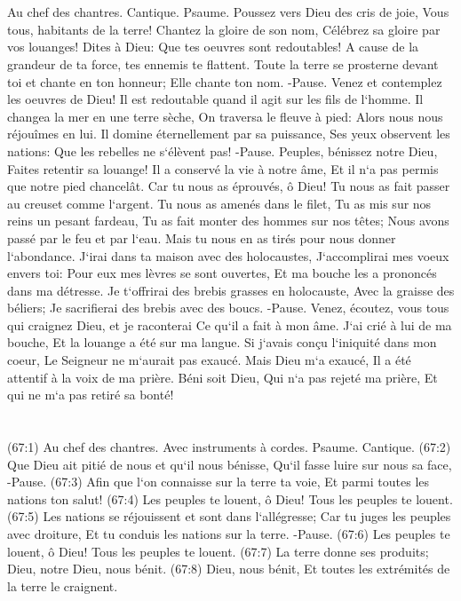 \chapter{}

\verse Au chef des chantres. Cantique. Psaume. Poussez vers Dieu des cris de joie, Vous tous, habitants de la terre! 
\verse Chantez la gloire de son nom, Célébrez sa gloire par vos louanges! 
\verse Dites à Dieu: Que tes oeuvres sont redoutables! A cause de la grandeur de ta force, tes ennemis te flattent. 
\verse Toute la terre se prosterne devant toi et chante en ton honneur; Elle chante ton nom. -Pause. 
\verse Venez et contemplez les oeuvres de Dieu! Il est redoutable quand il agit sur les fils de l`homme. 
\verse Il changea la mer en une terre sèche, On traversa le fleuve à pied: Alors nous nous réjouîmes en lui. 
\verse Il domine éternellement par sa puissance, Ses yeux observent les nations: Que les rebelles ne s`élèvent pas! -Pause. 
\verse Peuples, bénissez notre Dieu, Faites retentir sa louange! 
\verse Il a conservé la vie à notre âme, Et il n`a pas permis que notre pied chancelât. 
\verse Car tu nous as éprouvés, ô Dieu! Tu nous as fait passer au creuset comme l`argent. 
\verse Tu nous as amenés dans le filet, Tu as mis sur nos reins un pesant fardeau, 
\verse Tu as fait monter des hommes sur nos têtes; Nous avons passé par le feu et par l`eau. Mais tu nous en as tirés pour nous donner l`abondance. 
\verse J`irai dans ta maison avec des holocaustes, J`accomplirai mes voeux envers toi: 
\verse Pour eux mes lèvres se sont ouvertes, Et ma bouche les a prononcés dans ma détresse. 
\verse Je t`offrirai des brebis grasses en holocauste, Avec la graisse des béliers; Je sacrifierai des brebis avec des boucs. -Pause. 
\verse Venez, écoutez, vous tous qui craignez Dieu, et je raconterai Ce qu`il a fait à mon âme. 
\verse J`ai crié à lui de ma bouche, Et la louange a été sur ma langue. 
\verse Si j`avais conçu l`iniquité dans mon coeur, Le Seigneur ne m`aurait pas exaucé. 
\verse Mais Dieu m`a exaucé, Il a été attentif à la voix de ma prière. 
\verse Béni soit Dieu, Qui n`a pas rejeté ma prière, Et qui ne m`a pas retiré sa bonté! 

\chapter{}

\verse (67:1) Au chef des chantres. Avec instruments à cordes. Psaume. Cantique. (67:2) Que Dieu ait pitié de nous et qu`il nous bénisse, Qu`il fasse luire sur nous sa face, -Pause. 
\verse (67:3) Afin que l`on connaisse sur la terre ta voie, Et parmi toutes les nations ton salut! 
\verse (67:4) Les peuples te louent, ô Dieu! Tous les peuples te louent. 
\verse (67:5) Les nations se réjouissent et sont dans l`allégresse; Car tu juges les peuples avec droiture, Et tu conduis les nations sur la terre. -Pause. 
\verse (67:6) Les peuples te louent, ô Dieu! Tous les peuples te louent. 
\verse (67:7) La terre donne ses produits; Dieu, notre Dieu, nous bénit. 
\verse (67:8) Dieu, nous bénit, Et toutes les extrémités de la terre le craignent. 

